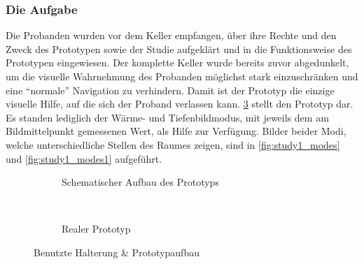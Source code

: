 \subsubsection{Die Aufgabe}
Die Probanden wurden vor dem Keller empfangen, über ihre Rechte und den Zweck des Prototypen sowie der Studie aufgeklärt und in die Funktionsweise des Prototypen eingewiesen.
Der komplette Keller wurde bereits zuvor abgedunkelt, um die visuelle Wahrnehmung des Probanden möglichst stark einzuschränken und eine \enquote{normale} Navigation zu verhindern.
Damit ist der Prototyp die einzige visuelle Hilfe, auf die sich der Proband verlassen kann.
\cref{fig:study1_proto} stellt den Prototyp dar.
Es standen lediglich der Wärme- und Tiefenbildmodus, mit jeweils dem am Bildmittelpunkt gemessenen Wert, als Hilfe zur Verfügung.
Bilder beider Modi, welche unterschiedliche Stellen des Raumes zeigen, sind in \cref{fig:study1_modes} und \cref{fig:study1_modes1} aufgeführt.

\begin{figure}[t]
	\centering
	\begin{subfigure}[t]{0.55\textwidth}
		\centering
		\caption{Schematischer Aufbau des Prototyps}
		\label{fig:study1_proto_model}
	\end{subfigure}
	~
	\begin{subfigure}[t]{0.3\textwidth}
		\centering
		\caption{Realer Prototyp}
		\label{fig:study1_proto_real}
	\end{subfigure}
	\caption{Benutzte Halterung \& Prototypaufbau}
	\label{fig:study1_proto}
\end{figure}

